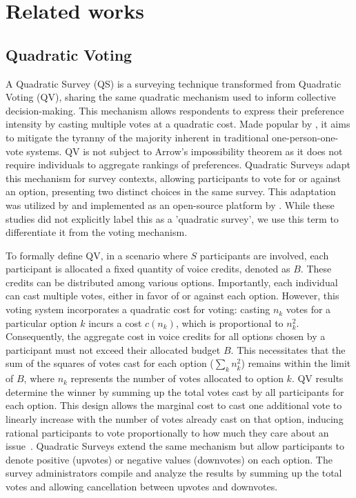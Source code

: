 \section{Related works}
\label{sec:relatedWorks}

\subsection{Quadratic Voting}
A Quadratic Survey (QS) is a surveying technique transformed from Quadratic Voting (QV), sharing the same quadratic mechanism used to inform collective decision-making. This mechanism allows respondents to express their preference intensity by casting multiple votes at a quadratic cost. Made popular by \textcite{posner2018radical, lalley2018quadratic}, it aims to mitigate the tyranny of the majority inherent in traditional one-person-one-vote systems. QV is not subject to Arrow's impossibility theorem as it does not require individuals to aggregate rankings of preferences. Quadratic Surveys adapt this mechanism for survey contexts, allowing participants to vote for or against an option, presenting two distinct choices in the same survey. This adaptation was utilized by \textcite{quarfoot2017quadratic} and implemented as an open-source platform by \textcite{bassettiCivicbaseOpensourcePlatform2023}. While these studies did not explicitly label this as a 'quadratic survey', we use this term to differentiate it from the voting mechanism.

To formally define QV, in a scenario where $S$ participants are involved, each participant is allocated a fixed quantity of voice credits, denoted as $B$. These credits can be distributed among various options. Importantly, each individual can cast multiple votes, either in favor of or against each option. However, this voting system incorporates a quadratic cost for voting: casting $n_k$ votes for a particular option $k$ incurs a cost $c(n_k)$, which is proportional to $n_k^2$. Consequently, the aggregate cost in voice credits for all options chosen by a participant must not exceed their allocated budget $B$. This necessitates that the sum of the squares of votes cast for each option ($\sum_k n_k^2$) remains within the limit of $B$, where $n_k$ represents the number of votes allocated to option $k$. QV results determine the winner by summing up the total votes cast by all participants for each option. This design allows the marginal cost to cast one additional vote to linearly increase with the number of votes already cast on that option, inducing rational participants to vote proportionally to how much they care about an issue~\cite{posner2018radical}. Quadratic Surveys extend the same mechanism but allow participants to denote positive (upvotes) or negative values (downvotes) on each option. The survey administrators compile and analyze the results by summing up the total votes and allowing cancellation between upvotes and downvotes.

